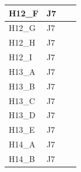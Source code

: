 \begin{longtable}{|l|l|l|l|}
H12\_F                           & J7                                                &                                                  &                                                  \\ \hline
H12\_G                           & J7                                                &                                                  &                                                  \\ \hline
H12\_H                           & J7                                                &                                                  &                                                  \\ \hline
H12\_I                           & J7                                                &                                                  &                                                  \\ \hline
H13\_A                           & J7                                                &                                                  &                                                  \\ \hline
H13\_B                           & J7                                                &                                                  &                                                  \\ \hline
H13\_C                           & J7                                                &                                                  &                                                  \\ \hline
H13\_D                           & J7                                                &                                                  &                                                  \\ \hline
H13\_E                           & J7                                                &                                                  &                                                  \\ \hline
H14\_A                           & J7                                                &                                                  &                                                  \\ \hline
H14\_B                           & J7                                                &                                                  &                                                  \\ \hline

\end{longtable}
